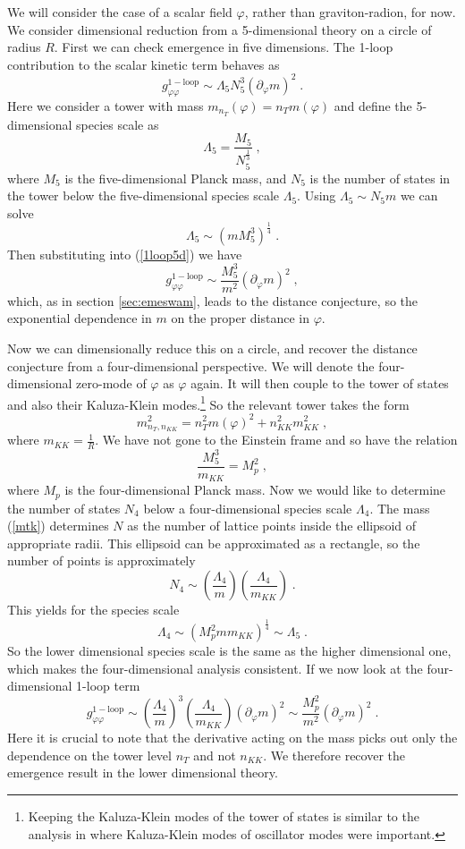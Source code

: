 \documentclass[11pt,a4paper]{article}
\numberwithin{equation}{section}
\numberwithin{table}{section}\setlength{\multlinegap}{25pt}
\newcommand{\be}{\begin{equation}}
\newcommand{\ee}{\end{equation}}
\begin{document}
{We will consider the case of a scalar field $\varphi$, rather than graviton-radion, for now. We consider dimensional reduction from a 5-dimensional theory on a circle of radius $R$. First we can check emergence in five dimensions. The 1-loop contribution to the scalar kinetic term behaves as
\be
g_{\varphi\varphi}^{\mathrm{1-loop}} \sim \Lambda_{5} N^3_5 \left( \partial_{\varphi} m \right)^2 \;.
\label{1loop5d}
\ee
Here we consider a tower with mass $m_{n_T}\left(\varphi\right) = n_T m\left(\varphi\right)$ and define the 5-dimensional species scale as 
\be
\Lambda_5 = \frac{M_5}{N_5^{\frac13}} \;,
\ee
where $M_5$ is the five-dimensional Planck mass, and $N_5$ is the number of states in the tower below the five-dimensional species scale $\Lambda_5$. Using $\Lambda_5\sim N_5 m$ we can solve
\be
\Lambda_5 \sim \left(m M_5^3 \right)^{\frac14} \;.
\ee
Then substituting into (\ref{1loop5d}) we have 
\be
g_{\varphi\varphi}^{\mathrm{1-loop}} \sim \frac{M_5^3 }{m^2}\left( \partial_{\varphi} m \right)^2 \;,
\ee
which, as in section \ref{sec:emeswam}, leads to the distance conjecture, so the exponential dependence in $m$ on the proper distance in $\varphi$. 

Now we can dimensionally reduce this on a circle, and recover the distance conjecture from a four-dimensional perspective. We will denote the four-dimensional zero-mode of $\varphi$ as $\varphi$ again. It will then couple to the tower of states and also their Kaluza-Klein modes.\footnote{Keeping the Kaluza-Klein modes of the tower of states is similar to the analysis in \cite{Dvali:2009ks,Klaewer:2018yxi} where Kaluza-Klein modes of oscillator modes were important.} So the relevant tower takes the form
\be
m^2_{n_T,n_{KK}} = n_T^2 m\left(\varphi\right) ^2 + n^2_{KK} m^2_{KK} \;,
\label{mtk}
\ee
where $m_{KK}=\frac{1}{R}$. We have not gone to the Einstein frame and so have the relation
\be
\frac{M_5^3}{m_{KK}} = M^2_p \;,
\ee
where $M_p$ is the four-dimensional Planck mass. Now we would like to determine the number of states $N_4$ below a four-dimensional species scale $\Lambda_4$. The mass (\ref{mtk}) determines $N$ as the number of lattice points inside the ellipsoid of appropriate radii. This ellipsoid can be approximated as a rectangle, so the number of points is approximately
\be
N_4 \sim \left( \frac{\Lambda_4}{m}\right) \left( \frac{\Lambda_4}{m_{KK}}\right) \;.
\ee
This yields for the species scale
\be
\Lambda_4 \sim \left(M_p^2 m m_{KK} \right)^{\frac14} \sim \Lambda_5 \;.
\ee
So the lower dimensional species scale is the same as the higher dimensional one, which makes the four-dimensional analysis consistent. If we now look at the four-dimensional 1-loop term
\be
g_{\varphi\varphi}^{\mathrm{1-loop}} \sim \left( \frac{\Lambda_4}{m}\right)^3 \left( \frac{\Lambda_4}{m_{KK}}\right) \left( \partial_{\varphi} m \right)^2 \sim \frac{M_p^2}{m^2} \left( \partial_{\varphi} m \right)^2  \;.
\label{1loop4d}
\ee
Here it is crucial to note that the derivative acting on the mass picks out only the dependence on the tower level $n_T$ and not $n_{KK}$. We therefore recover the emergence result in the lower dimensional theory. 

}
\end{document}
